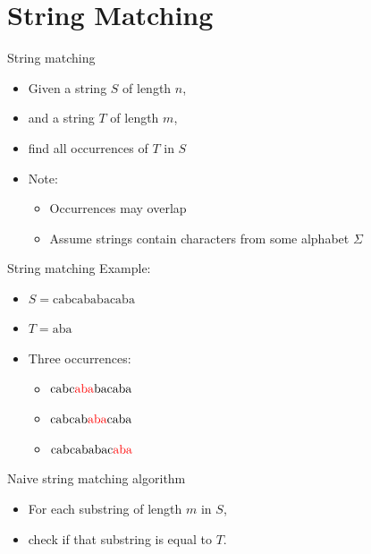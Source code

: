 \documentclass{beamer}
\begin{document}
\section*{String Matching}

\begin{frame}[plain]{String matching}
	\begin{itemize}
		\item Given a string $S$ of length $n$,
		\item and a string $T$ of length $m$,
		\item find all occurrences of $T$ in $S$
    \end{itemize}
    \begin{itemize}
		\item Note:
        \begin{itemize}
            \item Occurrences may overlap
            \item Assume strings contain characters from some alphabet $\Sigma$
        \end{itemize}
	\end{itemize}
\end{frame}

\begin{frame}[plain]{String matching}
	Example:
	\begin{itemize}
		\item $S = \mathrm{cabcababacaba}$
		\item $T = \mathrm{aba}$
	\end{itemize}
    \begin{itemize}
        \item<2-> Three occurrences:
            \begin{itemize}
                \item<3-> $\mathrm{cabc{\color{red}{aba}}bacaba}$
                \item<4-> $\mathrm{cabcab{\color{red}{aba}}caba}$
                \item<5-> $\mathrm{cabcababac{\color{red}{aba}}}$
            \end{itemize}
    \end{itemize}
\end{frame}

\begin{frame}[plain]{Naive string matching algorithm}
	\begin{itemize}
	\item For each substring of length $m$ in $S$,
	\item check if that substring is equal to $T$.
	\end{itemize}
		
\end{frame}
\end{document}
